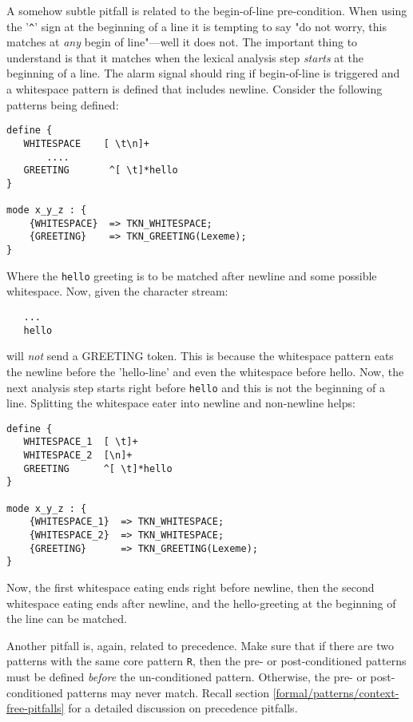 A somehow subtle pitfall is related to the begin-of-line pre-condition.
When using the '\verb|^|' sign at the beginning of a line it is tempting to
say "do not worry, this matches at {\it any} begin of line"---well it
does not. The important thing to understand is that it matches when the lexical analysis
    step {\it starts} at the beginning of a line. The alarm signal should ring
   if begin-of-line is triggered and a whitespace pattern is defined that includes newline.
Consider the following patterns being defined:

\begin{lstlisting}
define {
   WHITESPACE    [ \t\n]+
       ....
   GREETING       ^[ \t]*hello
}

mode x_y_z : {
    {WHITESPACE}  => TKN_WHITESPACE;
    {GREETING}    => TKN_GREETING(Lexeme);
}

\end{lstlisting}

Where the {\tt hello} greeting is to be matched after newline and some possible whitespace.
Now, given the character stream:

\begin{lstlisting}
   ...
   hello
\end{lstlisting}

will {\it not} send a GREETING token. This is because the whitespace pattern eats
the newline before the 'hello-line' and even the whitespace before hello. Now, the
next analysis step starts right before {\tt hello} and this is not the beginning
of a line. Splitting the whitespace eater into newline and non-newline helps:

\begin{lstlisting}
define {
   WHITESPACE_1  [ \t]+
   WHITESPACE_2  [\n]+
   GREETING      ^[ \t]*hello
}

mode x_y_z : {
    {WHITESPACE_1}  => TKN_WHITESPACE;
    {WHITESPACE_2}  => TKN_WHITESPACE;
    {GREETING}      => TKN_GREETING(Lexeme);
}

\end{lstlisting}

Now, the first whitespace eating ends right before newline, then the second
whitespace eating ends after newline, and the hello-greeting at the beginning
of the line can be matched.

Another pitfall is, again, related to precedence. Make sure that if there
are two patterns with the same core pattern {\tt R}, then the pre- or post-conditioned patterns
must be defined {\it before} the un-conditioned pattern. Otherwise, the
pre- or post-conditioned patterns may never match. Recall section
\ref{formal/patterns/context-free-pitfalls} for a detailed discussion on precedence pitfalls.

